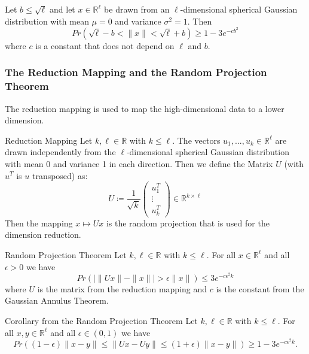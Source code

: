\documentclass{panikzettel}
\begin{document}
\begin{theo}
Let $b\leq \sqrt{\ell}$ and let $x\in\mathbb{R}^\ell$ be drawn from an $\ell$-dimensional spherical Gaussian distribution with mean $\mu=0$ and variance $\sigma^2=1$. Then
\[
Pr(\sqrt{\ell}-b < \parallel x\parallel < \sqrt{\ell}+b)\geq 1-3e^{-cb^2}
\]
where $c$ is a constant that does not depend on $\ell$ and $b$.
\end{theo}

\subsubsection{The Reduction Mapping and the Random Projection Theorem}
The reduction mapping is used to map the high-dimensional data to a lower dimension.

\begin{halfboxl}
\vspace{-\baselineskip}
\begin{defi}{Reduction Mapping}
Let $k,\ell\in\mathbb{R}$ with $k\leq\ell$. The vectors $u_1,...,u_k\in\mathbb{R}^\ell$ are drawn independently from the $\ell$-dimensional spherical Gaussian distribution with mean 0 and variance 1 in each direction. Then we define the Matrix $U$ (with $u^T$ is $u$ transposed) as:
\[
U\coloneqq \frac{1}{\sqrt{k}}
\begin{pmatrix}
u_1^T\\
\vdots\\
u_k^T
\end{pmatrix}
\in\mathbb{R}^{k\times\ell}
\]
Then the mapping $x\mapsto Ux$ is the random projection that is used for the dimension reduction.
\end{defi}

\end{halfboxl}
\begin{halfboxr}
\vspace{-\baselineskip}
\begin{theo}{Random Projection Theorem}
Let $k,\ell\in\mathbb{R}$ with $k\leq\ell$. For all $x\in\mathbb{R}^\ell$ and all $\epsilon>0$ we have
\[
Pr\left(\mid \parallel Ux \parallel - \parallel x\parallel \mid > \epsilon \parallel x \parallel\right) \leq 3e^{-c\epsilon^2k}
\]
where $U$ is the matrix from the reduction mapping and $c$ is the constant from the Gaussian Annulus Theorem.
\end{theo}
\end{halfboxr}

\begin{theo}{Corollary from the Random Projection Theorem}
Let $k,\ell\in\mathbb{R}$ with $k\leq\ell$. For all $x,y\in\mathbb{R}^\ell$ and all $\epsilon\in (0,1)$ we have
\[
Pr\left( (1-\epsilon) \parallel x-y \parallel \leq \parallel Ux - Uy \parallel \leq (1+\epsilon) \parallel x-y \parallel \right) \geq 1 - 3e^{-c\epsilon^2k}.
\]
\end{theo}
\end{document}
